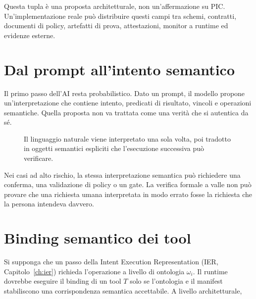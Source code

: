 \documentclass[10pt,oneside,openany]{book}
\begin{document}
Questa tupla è una proposta architetturale, non un'affermazione su PIC. Un'implementazione reale può distribuire questi campi tra schemi, contratti, documenti di policy, artefatti di prova, attestazioni, monitor a runtime ed evidenze esterne.

\section{Dal prompt all'intento semantico}
Il primo passo dell'AI resta probabilistico. Dato un prompt, il modello propone un'interpretazione che contiene intento, predicati di risultato, vincoli e operazioni semantiche. Quella proposta non va trattata come una verità che si autentica da sé.

\begin{figure}[ht]
\centering
{}
\caption{Il linguaggio naturale viene interpretato una sola volta, poi tradotto in oggetti semantici espliciti che l'esecuzione successiva può verificare.}
\end{figure}

Nei casi ad alto rischio, la stessa interpretazione semantica può richiedere una conferma, una validazione di policy o un gate. La verifica formale a valle non può provare che una richiesta umana interpretata in modo errato fosse la richiesta che la persona intendeva davvero.

\section{Binding semantico dei tool}
Si supponga che un passo della Intent Execution Representation (IER, Capitolo~\ref{ch:ier}) richieda l'operazione a livello di ontologia $\omega_i$. Il runtime dovrebbe eseguire il binding di un tool $T$ solo se l'ontologia e il manifest stabiliscono una corrispondenza semantica accettabile. A livello architetturale,
\end{document}
